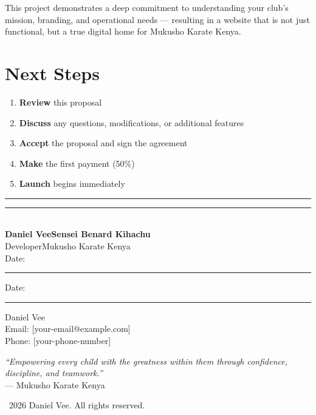 \documentclass[12pt,a4paper]{article}
\begin{document}
This project demonstrates a deep commitment to understanding your club's mission, branding, and operational needs --- resulting in a website that is not just functional, but a true digital home for Mukusho Karate Kenya.

\section{Next Steps}

\begin{enumerate}[leftmargin=1.5em]
    \item \textbf{Review} this proposal
    \item \textbf{Discuss} any questions, modifications, or additional features
    \item \textbf{Accept} the proposal and sign the agreement
    \item \textbf{Make} the first payment (50\%)
    \item \textbf{Launch} begins immediately
\end{enumerate}

\vspace{2cm}

\noindent\rule{6cm}{0.4pt}\hfill\rule{6cm}{0.4pt}\\[0.3em]
\textbf{Daniel Vee}\hfill\textbf{Sensei Benard Kihachu}\\
Developer\hfill Mukusho Karate Kenya\\[0.3em]
Date: \rule{4cm}{0.4pt}\hfill Date: \rule{4cm}{0.4pt}

\vspace{2cm}
\begin{center}
    \small\textcolor{mkgray}{
    Daniel Vee\\
    Email: [your-email@example.com]\\
    Phone: [your-phone-number]
    }
\end{center}

\vspace{1cm}
\begin{center}
    \small\textit{\textcolor{mkgray}{``Empowering every child with the greatness within them through confidence, discipline, and teamwork.''}}\\
    \small\textcolor{mkgray}{--- Mukusho Karate Kenya}
\end{center}

\vfill
\begin{center}
    \small\textcolor{mkgray}{\textcopyright\ 2026 Daniel Vee. All rights reserved.}
\end{center}
\end{document}
